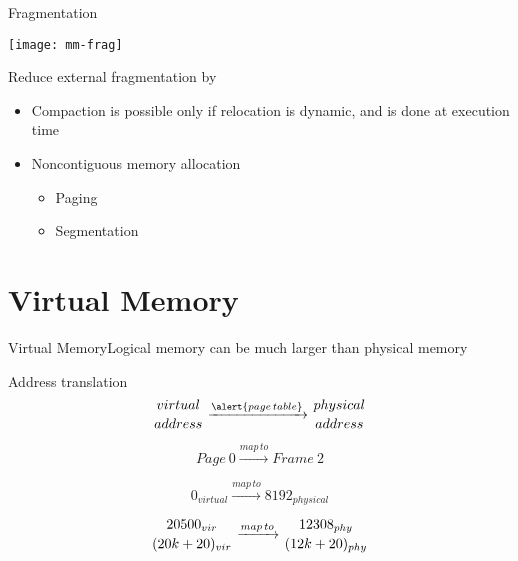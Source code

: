 \begin{frame}{Fragmentation}
  \begin{minipage}{.35\textwidth}
    \texttt{[image: mm-frag]}
  \end{minipage}\hfill
  \begin{minipage}{.6\textwidth}
    \begin{iblock}{Reduce external fragmentation by}
      \begin{itemize}
      \item \alert{Compaction} is possible only if relocation is dynamic,
        and is done at execution time
      \item \alert{Noncontiguous memory allocation}
        \begin{itemize}
        \item Paging
        \item Segmentation
        \end{itemize}
      \end{itemize}
    \end{iblock}
  \end{minipage}
\end{frame}

\section{Virtual Memory}

\begin{frame}{Virtual Memory}{Logical memory can be much larger than physical memory}
  \begin{minipage}{.4\textwidth}
  \end{minipage}\hfill
  \begin{minipage}{.48\textwidth}
    \begin{iblock}{Address translation}
      $$\genfrac{}{}{0pt}{}{virtual}{address}
      \xrightarrow{\alert{page\,table}}
      \genfrac{}{}{0pt}{}{physical}{address}$$
      
      $$Page\ 0\xrightarrow{map\,to}Frame\ 2$$
      
      $$0_{virtual}\xrightarrow{map\,to}8192_{physical}$$
      
      $$\genfrac{}{}{0pt}{}{20500_{vir}}{(20k+20)_{vir}}
      \xrightarrow{map\,to} \genfrac{}{}{0pt}{}{12308_{phy}}{(12k+20)_{phy}}$$
    \end{iblock}
  \end{minipage}
\end{frame}

